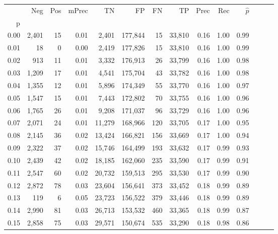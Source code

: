 \begin{tabular}{rrrrrrrrrrrrrr}
\toprule
{} &    Neg &  Pos & mPrec &       TN &       FP &      FN &      TP &  Prec &   Rec & $\hat{p}$ \\
p    &        &      &       &          &          &         &         &       &       &           \\
\midrule
0.00 &  2,401 &   15 &  0.01 &    2,401 &  177,844 &      15 &  33,810 &  0.16 &  1.00 &      0.99 \\
0.01 &     18 &    0 &  0.00 &    2,419 &  177,826 &      15 &  33,810 &  0.16 &  1.00 &      0.99 \\
0.02 &    913 &   11 &  0.01 &    3,332 &  176,913 &      26 &  33,799 &  0.16 &  1.00 &      0.98 \\
0.03 &  1,209 &   17 &  0.01 &    4,541 &  175,704 &      43 &  33,782 &  0.16 &  1.00 &      0.98 \\
0.04 &  1,355 &   12 &  0.01 &    5,896 &  174,349 &      55 &  33,770 &  0.16 &  1.00 &      0.97 \\
0.05 &  1,547 &   15 &  0.01 &    7,443 &  172,802 &      70 &  33,755 &  0.16 &  1.00 &      0.96 \\
0.06 &  1,765 &   26 &  0.01 &    9,208 &  171,037 &      96 &  33,729 &  0.16 &  1.00 &      0.96 \\
0.07 &  2,071 &   24 &  0.01 &   11,279 &  168,966 &     120 &  33,705 &  0.17 &  1.00 &      0.95 \\
0.08 &  2,145 &   36 &  0.02 &   13,424 &  166,821 &     156 &  33,669 &  0.17 &  1.00 &      0.94 \\
0.09 &  2,322 &   37 &  0.02 &   15,746 &  164,499 &     193 &  33,632 &  0.17 &  0.99 &      0.93 \\
0.10 &  2,439 &   42 &  0.02 &   18,185 &  162,060 &     235 &  33,590 &  0.17 &  0.99 &      0.91 \\
0.11 &  2,547 &   60 &  0.02 &   20,732 &  159,513 &     295 &  33,530 &  0.17 &  0.99 &      0.90 \\
0.12 &  2,872 &   78 &  0.03 &   23,604 &  156,641 &     373 &  33,452 &  0.18 &  0.99 &      0.89 \\
0.13 &    119 &    6 &  0.05 &   23,723 &  156,522 &     379 &  33,446 &  0.18 &  0.99 &      0.89 \\
0.14 &  2,990 &   81 &  0.03 &   26,713 &  153,532 &     460 &  33,365 &  0.18 &  0.99 &      0.87 \\
0.15 &  2,858 &   75 &  0.03 &   29,571 &  150,674 &     535 &  33,290 &  0.18 &  0.98 &      0.86 \\

\end{tabular}
